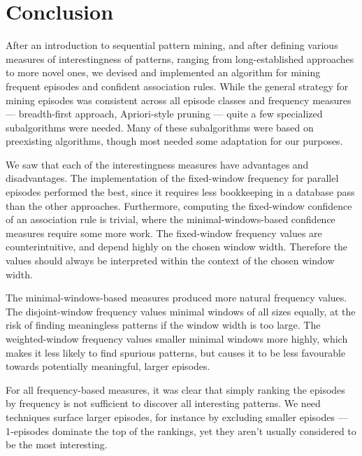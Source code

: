 \chapter{Conclusion}

After an introduction to sequential pattern mining, and after defining various measures of interestingness of patterns, ranging from long-established approaches to more novel ones, we devised and implemented an algorithm for mining frequent episodes and confident association rules. While the general strategy for mining episodes was consistent across all episode classes and frequency measures --- breadth-first approach, Apriori-style pruning --- quite a few specialized subalgorithms were needed. Many of these subalgorithms were based on preexisting algorithms, though most needed some adaptation for our purposes.

We saw that each of the interestingness measures have advantages and disadvantages. The implementation of the fixed-window frequency for parallel episodes performed the best, since it requires less bookkeeping in a database pass than the other approaches. Furthermore, computing the fixed-window confidence of an association rule is trivial, where the minimal-windows-based confidence measures require some more work. The fixed-window frequency values are counterintuitive, and depend highly on the chosen window width. Therefore the values should always be interpreted within the context of the chosen window width.

The minimal-windows-based measures produced more natural frequency values. The disjoint-window frequency values minimal windows of all sizes equally, at the risk of finding meaningless patterns if the window width is too large. The weighted-window frequency values smaller minimal windows more highly, which makes it less likely to find spurious patterns, but causes it to be less favourable towards potentially meaningful, larger episodes.

For all frequency-based measures, it was clear that simply ranking the episodes by frequency is not sufficient to discover all interesting patterns. We need techniques surface larger episodes, for instance by excluding smaller episodes --- 1-episodes dominate the top of the rankings, yet they aren't usually considered to be the most interesting.

